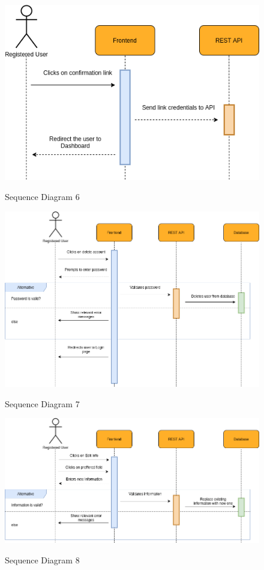 \begin{figure}[H]
    \centering
    \caption{Sequence Diagram 6}
    \includegraphics[scale=0.5]{./diagrams/sequence/seq-06.png}
    \label{fig:seq-06}
    
\end{figure}


\begin{figure}[H]
    \centering
    \caption{Sequence Diagram 7}
    \includegraphics[scale=0.5]{./diagrams/sequence/seq-07.png}
    \label{fig:seq-07}
    
\end{figure}


\begin{figure}[H]
    \centering
    \caption{Sequence Diagram 8}
    \includegraphics[scale=0.5]{./diagrams/sequence/seq-08.png}
    \label{fig:seq-08}
    
\end{figure}


